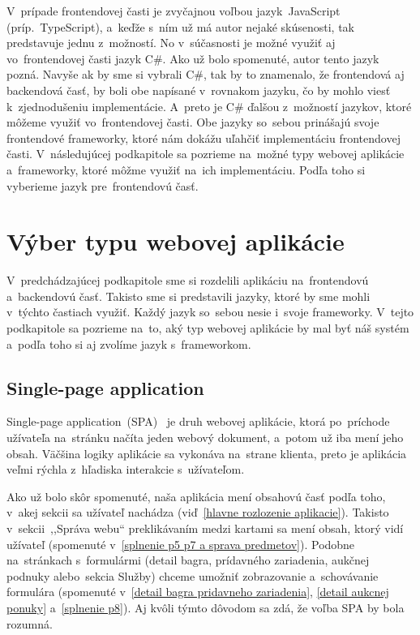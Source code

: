 V~prípade frontendovej časti je zvyčajnou voľbou jazyk~JavaScript (príp.~TypeScript), a~keďže s~ním už má autor nejaké skúsenosti, tak predstavuje jednu z~možností. No v~súčasnosti je možné využiť aj vo~frontendovej časti jazyk C\#. Ako už bolo spomenuté, autor tento jazyk pozná. Navyše ak by sme si vybrali C\#, tak by to znamenalo, že frontendová aj backendová časť, by boli obe napísané v~rovnakom jazyku, čo by mohlo viesť k~zjednodušeniu implementácie. A~preto je C\# ďalšou z~možností jazykov, ktoré môžeme využiť vo~frontendovej časti. Obe jazyky so~sebou prinášajú svoje frontendové frameworky, ktoré nám dokážu uľahčiť implementáciu frontendovej časti. V~následujúcej podkapitole sa pozrieme na~možné typy webovej aplikácie a~frameworky, ktoré môžme využiť na~ich implementáciu. Podľa toho si vyberieme jazyk pre~frontendovú časť.

\section{Výber typu webovej aplikácie}
\label{vyber typu webovej aplikacie}

V~predchádzajúcej podkapitole sme si rozdelili aplikáciu na~frontendovú a~backendovú časť. Takisto sme si predstavili jazyky, ktoré by sme mohli v~týchto častiach využiť. Každý jazyk so~sebou nesie i~svoje frameworky. V~tejto podkapitole sa pozrieme na~to, aký typ webovej aplikácie by mal byť náš systém a~podľa toho si aj zvolíme jazyk s~frameworkom.

\subsection{Single-page application}
\label{single page application}

Single-page application~(SPA)~\cite{spa} je druh webovej aplikácie, ktorá po~príchode užívateľa na~stránku načíta jeden webový dokument, a~potom už iba mení jeho obsah. Väčšina logiky aplikácie sa vykonáva na~strane klienta, preto je aplikácia veľmi rýchla z~hľadiska interakcie s~užívateľom.

Ako už bolo skôr spomenuté, naša aplikácia mení obsahovú časť podľa toho, v~akej sekcii sa užívateľ nachádza (viď~\ref{hlavne rozlozenie aplikacie}). Takisto v~sekcii~,,Správa webu`` preklikávaním medzi kartami sa mení obsah, ktorý vidí užívateľ (spomenuté v~\ref{splnenie p5 p7 a sprava predmetov}). Podobne na~stránkach s~formulármi (detail bagra, prídavného zariadenia, aukčnej podnuky alebo~sekcia Služby) chceme umožniť zobrazovanie a~schovávanie formulára (spomenuté v~\ref{detail bagra pridavneho zariadenia}, \ref{detail aukcnej ponuky} a~\ref{splnenie p8}). Aj kvôli týmto dôvodom sa zdá, že voľba SPA by bola rozumná.

